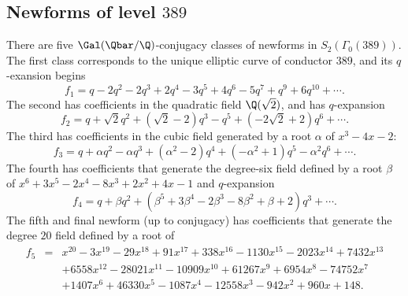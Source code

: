 \documentclass{report}
\begin{document}
\subsection{Newforms of level $389$}
There are five $\Gal(\Qbar/\Q)$-conjugacy classes of newforms in $S_2(\Gamma_0(389))$.
The first class corresponds to the unique elliptic curve of conductor $389$, and its
$q$-exansion begins
$$
  f_1 = q - {2}q^{2} - {2}q^{3} + {2}q^{4} - {3}q^{5} + {4}q^{6} - {5}q^{7} + q^{9} + {6}q^{10} + \cdots.
$$
The second has coefficients in the quadratic field $\Q(\sqrt{2})$, and has $q$-expansion
$$
  f_2 = q + {\sqrt{2}}q^{2}+({\sqrt{2} - {2}})q^{3} - q^{5}+({{-2}\sqrt{2} + {2}})q^{6}+ \cdots.
$$
The third has coefficients in the cubic field generated by a root $\alpha$ of
$x^3-4x-2$:
$$
  f_3 = q + {\alpha}q^{2} - {\alpha}q^{3}+({\alpha^{2} - {2}})q^{4}+({-\alpha^{2} + 1})q^{5} - {\alpha^{2}}q^{6} +\cdots.
$$
The fourth has coefficients that generate the degree-six field defined by
a root $\beta$ of $x^6+3x^5-2x^4-8x^3+2x^2+4x-1$ and $q$-expansion
$$
  f_4 = q + {\beta}q^{2}+({\beta^{5} + {3}\beta^{4} - {2}\beta^{3} - {8}\beta^{2} + \beta + {2}})q^{3}+\cdots.
$$
The fifth and final newform (up to conjugacy) has coefficients that generate
the degree $20$ field defined by a root of
\begin{eqnarray*}
f_5 &=& x^{20} - 3x^{19} - 29x^{18} + 91x^{17} + 338x^{16} - 1130x^{15} - 2023x^{14} + 7432x^{13} \\
&& + 6558x^{12} - 28021x^{11} - 10909x^{10} + 61267x^{9} + 6954x^8 - 74752x^7   \\
&& + 1407x^6+ 46330x^5 - 1087x^4 - 12558x^3 - 942x^2 + 960x + 148.
\end{eqnarray*}
\end{document}
